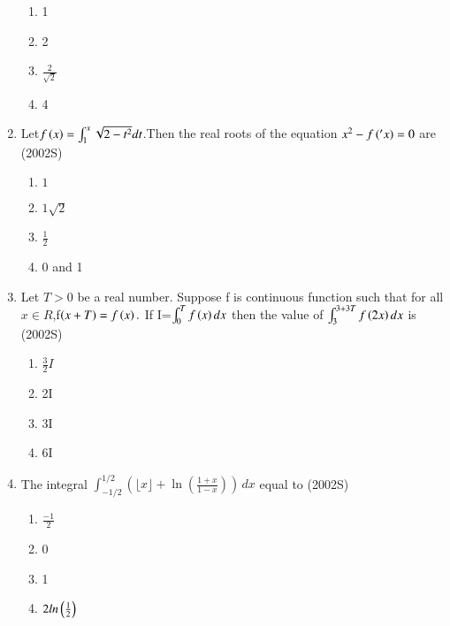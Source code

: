 \documentclass[journal,12pt,twocolumn]{IEEEtran}
\theoremstyle{remark}
\begin{document}
\begin{enumerate}
\begin{enumerate}
 \item  1
 \item  2
 \item  $\frac{2}{\sqrt{2}}$
 \item  4
\end{enumerate}
\item Let$f\left(x\right)=\int_{1}^{x}\sqrt{2-{t}^2} dt $.Then the real roots of the equation ${x}^2-f\left('x\right)=0$ are 
	\hfill(2002S)
\begin{enumerate}
  \item ${1}$
  \item ${1}{\sqrt2}$
  \item $\frac{1}{2}$
   \item 0 and 1
   \end{enumerate}
   \item Let $T>0$ be a real number. Suppose f is continuous function such that for all ${x}\in{R}$,f$\left(x+T\right)=f\left(x\right).$
   If I=$\int_{0}^{T}f\left(x\right)dx$ then the value of $\int_{3}^{3+3T} f\left(2x\right) dx $ is
		\hfill(2002S)
\begin{enumerate}
	\item $\frac{3}{2}{I}$
   \item 2I
   \item 3I
   \item 6I
   \end{enumerate}
   \item The integral $\int_{-1/2}^{1/2} \left( \lfloor x \rfloor + \ln \left( \frac{1+x}{1-x} \right) \right) \, dx$ equal to
	   \hfill(2002S)
\begin{enumerate}[label=(\alph*)]
	\item $\frac{-1}{2}$
 \item 0
 \item 1
 \item $2ln\left(\frac{1}{2}\right)$
 \end{enumerate}




\end{enumerate}
\end{document}
